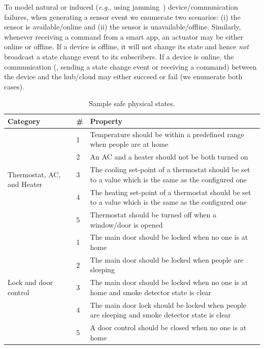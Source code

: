 To model natural or induced (\textit{e.g.}, using jamming~\cite{5473884}) device/communication 
failures, 
when generating a sensor event we enumerate two scenarios:
(i) the sensor is available/online and (ii) the sensor is unavailable/offline.
Similarly, whenever receiving a command from a smart app,
an actuator may be either online or offline.
If a device is offline, it will not change its state and hence {\em not} broadcast a state change event to its subscribers. {\color{black}If a device is online, 
the communication (\ie, sending a state change event or receiving a command) between the device and the hub/cloud may either succeed or fail (we enumerate both cases).}

\begin{table}[tb]
\ssp
\caption{Sample safe physical states.}
\label{table:racescenarios}
\centering
{
{\color{black}\begin{tabular}{| p{1.9cm} | p{0.5cm} | p{11.5cm} |}
\hline
\bf Category & \bf \# & \bf Property\\
\hline
\multirow{5}{1.9cm}{Thermostat, AC, and Heater} & 1 & Temperature should be within a predefined range when people are at home\\ \cline{2-3}
 & 2 & An AC and a heater should not be both turned on\\ \cline{2-3}
 & 3 & The cooling set-point of a thermostat should be set to a value which is the same as the configured one\\ \cline{2-3}
 & 4 & The heating set-point of a thermostat should be set to a value which is the same as the configured one\\ \cline{2-3}
 & 5 & Thermostat should be turned off when a window/door is opened\\ \cline{2-3}
\hline
\multirow{8}{1.9cm}{Lock and door control} & 1 & The main door should be locked when no one is at home\\ \cline{2-3}
& 2 & The main door should be locked when people are sleeping\\ \cline{2-3}
& 3 & The main door should be locked when no one is at home and smoke detector state is clear\\ \cline{2-3}
& 4 & The main door lock should be locked when people are sleeping and smoke detector state is clear\\ \cline{2-3}
& 5 & A door control should be closed when no one is at home\\ \cline{2-3}

\end{tabular}}}
\end{table}
